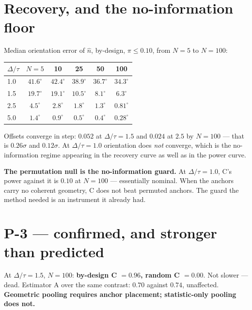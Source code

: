 \documentclass[11pt]{article}
\newcommand{\nhat}{\hat{n}}
\begin{document}
\section{Recovery, and the no-information floor}

Median orientation error of $\nhat$, by-design, $\pi \le 0.10$, from $N=5$ to $N=100$:

\begin{center}\small
\begin{tabular}{@{}lccccc@{}}
\toprule
$\Delta/\tau$ & $N=5$ & 10 & 25 & 50 & 100\\
\midrule
1.0 & $41.6^\circ$ & $42.4^\circ$ & $38.9^\circ$ & $36.7^\circ$ & $34.3^\circ$\\
1.5 & $19.7^\circ$ & $19.1^\circ$ & $10.5^\circ$ & $8.1^\circ$ & $\bm{6.3^\circ}$\\
2.5 & $4.5^\circ$ & $2.8^\circ$ & $1.8^\circ$ & $1.3^\circ$ & $\bm{0.81^\circ}$\\
5.0 & $1.4^\circ$ & $0.9^\circ$ & $0.5^\circ$ & $0.4^\circ$ & $\bm{0.28^\circ}$\\
\bottomrule
\end{tabular}
\end{center}

\noindent Offsets converge in step: $0.052$ at $\Delta/\tau = 1.5$ and $0.024$ at $2.5$ by
$N = 100$ --- that is $0.26\sigma$ and $0.12\sigma$. At $\Delta/\tau = 1.0$ orientation does
\emph{not} converge, which is the no-information regime appearing in the recovery curve as well as
in the power curve.

\begin{resultbox}
\noindent\textbf{The permutation null is the no-information guard.} At $\Delta/\tau = 1.0$,
C's power against it is $0.10$ at $N = 100$ --- essentially nominal. When the anchors carry no
coherent geometry, C does not beat permuted anchors. The guard the method needed is an instrument
it already had.
\end{resultbox}

\section{P-3 --- confirmed, and stronger than predicted}

\begin{limitbox}
\noindent At $\Delta/\tau = 1.5$, $N = 100$: \textbf{by-design C $= 0.96$, random C $= 0.00$}.
Not slower --- dead. Estimator A over the same contrast: $0.70$ against $0.74$, unaffected.
\textbf{Geometric pooling requires anchor placement; statistic-only pooling does not.}
\end{limitbox}
\end{document}
